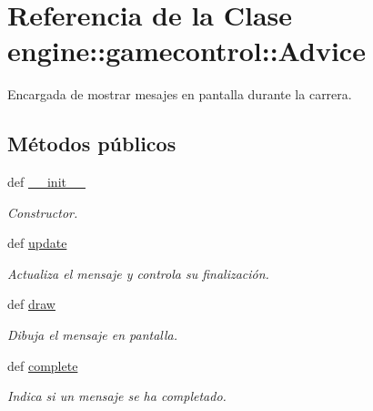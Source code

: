 \hypertarget{classengine_1_1gamecontrol_1_1Advice}{
\section{\-Referencia de la \-Clase engine\-:\-:gamecontrol\-:\-:\-Advice}
\label{classengine_1_1gamecontrol_1_1Advice}
}


\-Encargada de mostrar mesajes en pantalla durante la carrera.  


\subsection*{\-Métodos públicos}
\begin{DoxyCompactItemize}
\item 
def \hyperlink{classengine_1_1gamecontrol_1_1Advice_a8f76bcdbb6d91b7b0a75162b54caa7b8}{\-\_\-\-\_\-init\-\_\-\-\_\-}
\begin{DoxyCompactList}\small\item\em \-Constructor. \end{DoxyCompactList}\item 
\hypertarget{classengine_1_1gamecontrol_1_1Advice_af35bf77fb82180b623112e3fd785e139}{
def \hyperlink{classengine_1_1gamecontrol_1_1Advice_af35bf77fb82180b623112e3fd785e139}{update}}
\label{classengine_1_1gamecontrol_1_1Advice_af35bf77fb82180b623112e3fd785e139}

\begin{DoxyCompactList}\small\item\em \-Actualiza el mensaje y controla su finalización. \end{DoxyCompactList}\item 
def \hyperlink{classengine_1_1gamecontrol_1_1Advice_a1f32684a86a8b2b8555451c09bf2e0e6}{draw}
\begin{DoxyCompactList}\small\item\em \-Dibuja el mensaje en pantalla. \end{DoxyCompactList}\item 
def \hyperlink{classengine_1_1gamecontrol_1_1Advice_abd4e8218fc7b72396cf00a3e3b836deb}{complete}
\begin{DoxyCompactList}\small\item\em \-Indica si un mensaje se ha completado. \end{DoxyCompactList}\end{DoxyCompactItemize}
